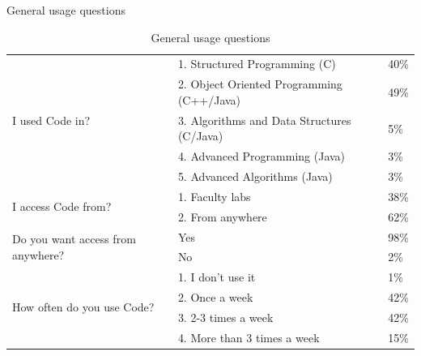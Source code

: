\begin{frame}[shrink=20]{General usage questions}
\begin{table}
\caption{General usage questions}
\begin{center}
\begin{tabular}{ |p{5cm}|p{5cm}|l| }
\hline
\multirow{5}{*}{I used Code in?} & 1. Structured Programming (C) & 40\% \\
\cline{2-3}
 & 2. Object Oriented Programming (C++/Java) & 49\% \\
 \cline{2-3}
 & 3. Algorithms and Data Structures (C/Java) & 5\% \\
 \cline{2-3}
 & 4. Advanced Programming (Java) & 3\% \\
 \cline{2-3}
 & 5. Advanced Algorithms (Java) & 3\% \\
 \cline{2-3}
\hline
\multirow{2}{*}{I access Code from?} & 1. Faculty labs & 38\% \\
 & 2. From anywhere & 62\% \\
 \hline
\multirow{2}{5cm}{Do you want access from anywhere?} & Yes & 98\% \\
\cline{2-3}
 & No & 2\% \\
\hline
\multirow{4}{*}{How often do you use Code?} & 1. I don't use it & 1\% \\
\cline{2-3}
 & 2. Once a week & 42\% \\
 \cline{2-3}
 & 3. 2-3 times a week & 42\% \\
 \cline{2-3}
 & 4. More than 3 times a week & 15\% \\
 \cline{2-3}
\hline
\end{tabular}
\label{table:general_questions}
\end{center}
\end{table}
\end{frame}

